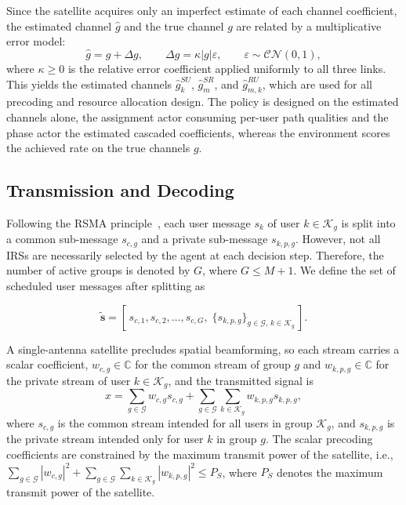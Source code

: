 \documentclass[12pt,onecolumn]{IEEEtran}
\begin{document}
Since the satellite acquires only an imperfect estimate of each channel coefficient, the estimated channel $\hat{g}$ and the true channel $g$ are related by a multiplicative error model:
\begin{equation}
    \hat{g} = g + \Delta g,
    \qquad
    \Delta g = \kappa \lvert g \rvert \varepsilon,
    \qquad
    \varepsilon \sim \mathcal{CN}(0,1),
\end{equation}
where $\kappa \geq 0$ is the relative error coefficient applied uniformly to all three links.
This yields the estimated channels $\hat{g}^{SU}_k$, $\hat{g}^{SR}_{m}$, and $\hat{g}^{RU}_{m,k}$, which are used for all precoding and resource allocation design.
The policy is designed on the estimated channels alone, the assignment actor consuming per-user path qualities and the phase actor the estimated cascaded coefficients, whereas the environment scores the achieved rate on the true channels $g$.

\subsection{Transmission and Decoding}

Following the RSMA principle~\cite{mao2018rate}, each user message $s_k$ of user $k \in \mathcal{K}_g$ is split into a common sub-message $s_{c,g}$ and a private sub-message $s_{k,p,g}$.
However, not all IRSs are necessarily selected by the agent at each decision step. 
Therefore, the number of active groups is denoted by $G$, where $G \leq M+1$.
We define the set of scheduled user messages after splitting as

\[
\tilde{\mathbf{s}} = [\,s_{c,1}, s_{c,2}, \ldots, s_{c,G},\; \{s_{k,p,g}\}_{g \in \mathcal{G},\, k \in \mathcal{K}_g}\,].
\]

A single-antenna satellite precludes spatial beamforming, so each stream carries a
scalar coefficient, $w_{c,g} \in \mathbb{C}$ for the common stream of group $g$ and
$w_{k,p,g} \in \mathbb{C}$ for the private stream of user $k \in \mathcal{K}_g$, and the
transmitted signal is
\begin{equation}
    x
    =
    \sum_{g \in \mathcal{G}} w_{c,g}s_{c,g}
    +
    \sum_{g \in \mathcal{G}}\sum_{k \in \mathcal{K}_g} w_{k,p,g}s_{k,p,g},
\end{equation}
where $s_{c,g}$ is the common stream intended for all users in group $\mathcal{K}_g$, and $s_{k,p,g}$ is the private stream intended only for user $k$ in group $g$.
The scalar precoding coefficients are constrained by the maximum transmit power of the satellite, i.e.,
$\sum_{g \in \mathcal{G}} |w_{c,g}|^2 + \sum_{g \in \mathcal{G}}\sum_{k \in \mathcal{K}_g} |w_{k,p,g}|^2 \leq P_S$,
where $P_S$ denotes the maximum transmit power of the satellite.
\end{document}
